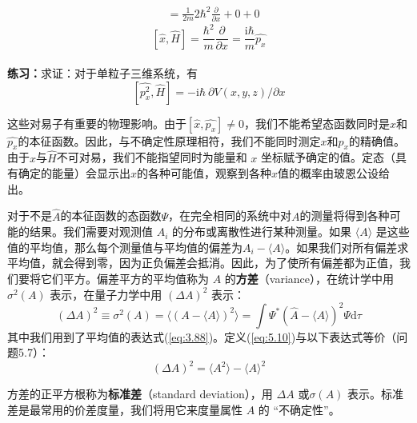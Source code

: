 \begin{examplebox}
\begin{equation*}
\begin{aligned}
                &= \frac{1}{2m}2\hbar^2\frac{\partial}{\partial x} + 0 + 0
            \end{aligned}
        \end{equation*}
        \begin{equation}
            \left[\hat{x},\hat{H}\right] = \frac{\hbar^2}{m}\frac{\partial}{\partial x} = \frac{\mathrm{i}\hbar}{m}\hat{p_x}
            \label{eq:5.8}
        \end{equation}
        \\
        \textbf{练习：}求证：对于单粒子三维系统，有
        \begin{equation}
            \left[\hat{p_x^2},\hat{H}\right] = -\mathrm{i}\hbar \:\partial V\left(x,y,z\right)/\partial x
            \label{eq:5.9}
        \end{equation}
    \end{examplebox}

    这些对易子有重要的物理影响。由于$\left[\hat{x},\hat{p_x}\right] \neq 0$，我们不能希望态函数同时是$\hat{x}$和$\hat{p_x}$的本征函数。因此，与不确定性原理相符，我们不能同时测定$x$和$p_x$的精确值。由于$\hat{x}$与$\hat{H}$不可对易，我们不能指望同时为能量和 $x$ 坐标赋予确定的值。定态（具有确定的能量）会显示出$x$的各种可能值，观察到各种$x$值的概率由玻恩公设给出。

    对于不是$\hat{A}$的本征函数的态函数$\Psi$，在完全相同的系统中对$A$的测量将得到各种可能的结果。我们需要对观测值 $A_i$ 的分布或离散性进行某种测量。如果 $\langle A \rangle$ 是这些值的平均值，那么每个测量值与平均值的偏差为$A_i - \langle A \rangle$。如果我们对所有偏差求平均值，就会得到零，因为正负偏差会抵消。因此，为了使所有偏差都为正值，我们要将它们平方。偏差平方的平均值称为 $A$ 的\textbf{方差}（variance），在统计学中用 $\sigma^2\left(A\right)$ 表示，在量子力学中用 $\left(\Delta A\right)^2$ 表示：
    \begin{equation}
        \left(\Delta A\right)^2 \equiv \sigma^2\left(A\right) = \langle \left(A - \langle A \rangle\right)^2 \rangle = \int \Psi^{\ast}\left(\hat{A}-\langle A \rangle\right)^2\Psi\mathrm{d}\tau
        \label{eq:5.10}
    \end{equation}
    其中我们用到了平均值的表达式(\ref{eq:3.88})。定义(\ref{eq:5.10})与以下表达式等价（问题5.7）：
    \begin{equation}
        \left(\Delta A\right)^2 = \langle A^2 \rangle - \langle A \rangle^2
        \label{eq:5.11}
    \end{equation}

    方差的正平方根称为\textbf{标准差}（standard deviation），用 $\Delta A$ 或$\sigma\left(A\right)$ 表示。标准差是最常用的价差度量，我们将用它来度量属性 $A$ 的 “不确定性”。

